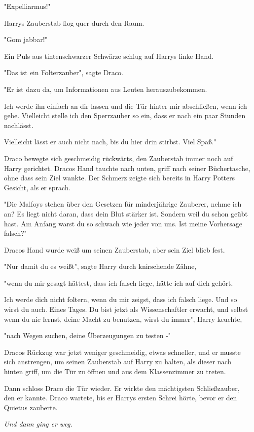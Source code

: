 {"Expelliarmus!"

Harrys Zauberstab flog quer durch den Raum.

"Gom jabbar!"

Ein Puls aus tintenschwarzer Schwärze schlug auf Harrys linke Hand.

"Das ist ein Folterzauber", sagte Draco.

"Er ist dazu da, um Informationen aus Leuten herauszubekommen.

Ich werde ihn einfach an dir lassen und die Tür hinter mir abschließen, wenn ich gehe. Vielleicht stelle ich den Sperrzauber so ein, dass er nach ein paar Stunden nachlässt.

Vielleicht lässt er auch nicht nach, bis du hier drin stirbst. Viel Spaß."

Draco bewegte sich geschmeidig rückwärts, den Zauberstab immer noch auf Harry gerichtet. Dracos Hand tauchte nach unten, griff nach seiner Büchertasche, ohne dass sein Ziel wankte. Der Schmerz zeigte sich bereits in Harry Potters Gesicht, als er sprach.

"Die Malfoys stehen über den Gesetzen für minderjährige Zauberer, nehme ich an? Es liegt nicht daran, dass dein Blut stärker ist. Sondern weil du schon geübt hast. Am Anfang warst du so schwach wie jeder von uns. Ist meine Vorhersage falsch?"

Dracos Hand wurde weiß um seinen Zauberstab, aber sein Ziel blieb fest.

"Nur damit du es weißt", sagte Harry durch knirschende Zähne,

"wenn du mir gesagt hättest, dass ich falsch liege, hätte ich auf dich gehört.

Ich werde dich nicht foltern, wenn du mir zeigst, dass ich falsch liege. Und so wirst du auch. Eines Tages. Du bist jetzt als Wissenschaftler erwacht, und selbst wenn du nie lernst, deine Macht zu benutzen, wirst du immer", Harry keuchte,

"nach Wegen suchen, deine Überzeugungen zu testen -"

Dracos Rückzug war jetzt weniger geschmeidig, etwas schneller, und er musste sich anstrengen, um seinen Zauberstab auf Harry zu halten, als dieser nach hinten griff, um die Tür zu öffnen und aus dem Klassenzimmer zu treten.

Dann schloss Draco die Tür wieder. Er wirkte den mächtigsten Schließzauber, den er kannte. Draco wartete, bis er Harrys ersten Schrei hörte, bevor er den Quietus zauberte.

\emph{Und dann ging er weg.}

}
